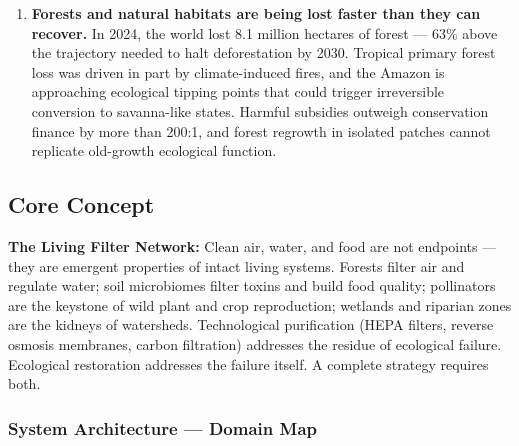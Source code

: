 \documentclass[11pt,letterpaper]{article}
\begin{document}
\begin{enumerate}[leftmargin=*, label=\textbf{\arabic*.}]
\item \textbf{Forests and natural habitats are being lost faster than they can recover.} In 2024, the world lost 8.1 million hectares of forest --- 63\% above the trajectory needed to halt deforestation by 2030. Tropical primary forest loss was driven in part by climate-induced fires, and the Amazon is approaching ecological tipping points that could trigger irreversible conversion to savanna-like states. Harmful subsidies outweigh conservation finance by more than 200:1, and forest regrowth in isolated patches cannot replicate old-growth ecological function.

\end{enumerate}

\subsection{Core Concept}

\textbf{The Living Filter Network:} Clean air, water, and food are not endpoints --- they are emergent properties of intact living systems. Forests filter air and regulate water; soil microbiomes filter toxins and build food quality; pollinators are the keystone of wild plant and crop reproduction; wetlands and riparian zones are the kidneys of watersheds. Technological purification (HEPA filters, reverse osmosis membranes, carbon filtration) addresses the residue of ecological failure. Ecological restoration addresses the failure itself. A complete strategy requires both.

\subsubsection{System Architecture --- Domain Map}
\end{document}
